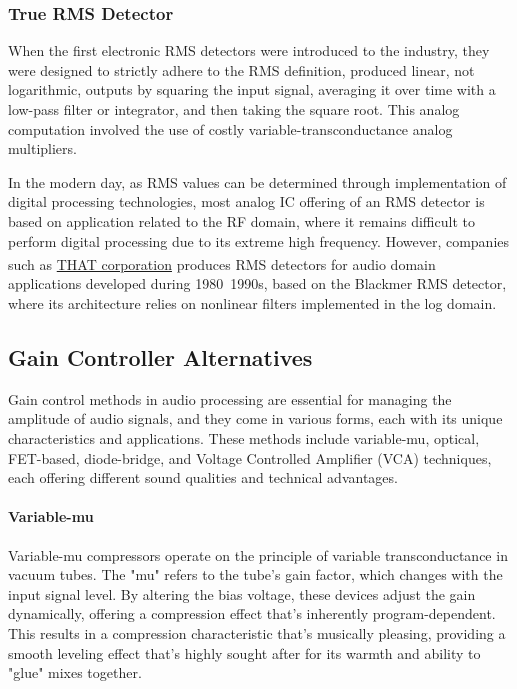 \documentclass[10pt]{article}
\begin{document}
\begin{multicols*}{2}
                \subsubsection{True RMS Detector}
                    When the first electronic RMS detectors were introduced to the industry, they were designed to strictly adhere to the RMS definition, produced linear, not logarithmic, outputs by squaring the input signal, averaging it over time with a low-pass filter or integrator, and then taking the square root. This analog computation involved the use of costly variable-transconductance analog multipliers. \cite{rms-history}\par
                    In the modern day, as RMS values can be determined through implementation of digital processing technologies, most analog IC offering of an RMS detector is based on application related to the RF domain, where it remains difficult to perform digital processing due to its extreme high frequency. However, companies such as \href{https://www.thatcorp.com/}{THAT corporation\textsuperscript{\texttrademark}} produces RMS detectors for audio domain applications developed during 1980~1990s, based on the Blackmer RMS detector, where its architecture relies on nonlinear filters implemented in the log domain.

            \subsection{Gain Controller Alternatives}\label{sect:vca}
                Gain control methods in audio processing are essential for managing the amplitude of audio signals, and they come in various forms, each with its unique characteristics and applications. These methods include variable-mu, optical, FET-based, diode-bridge, and Voltage Controlled Amplifier (VCA) techniques, each offering different sound qualities and technical advantages.

                \paragraph{Variable-mu}
                    Variable-mu compressors operate on the principle of variable transconductance in vacuum tubes. The "mu" refers to the tube's gain factor, which changes with the input signal level. By altering the bias voltage, these devices adjust the gain dynamically, offering a compression effect that's inherently program-dependent. This results in a compression characteristic that's musically pleasing, providing a smooth leveling effect that's highly sought after for its warmth and ability to "glue" mixes together.


\end{multicols*}
\end{document}
